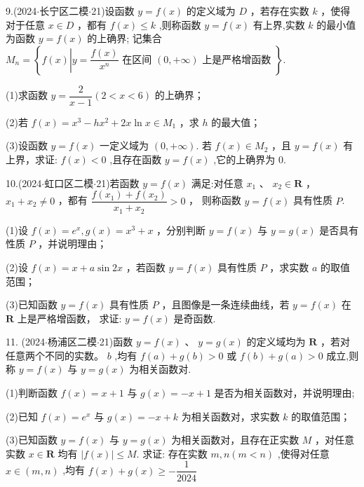 9.(2024$\cdot$长宁区二模$\cdot$21)设函数 $y = f\left( x\right)$ 的定义域为 $D$ ，若存在实数 $k$ ，使得对于任意 $x \in  D$ ，都有 $f\left( x\right)  \leq  k$ ,则称函数 $y = f\left( x\right)$ 有上界,实数 $k$ 的最小值为函数 $y = f\left( x\right)$ 的上确界; 记集合 ${M}_{n} =  \left\{  {f\left( x\right) \left| {y = \dfrac{f\left( x\right) }{{x}^{n}}\text{ 在区间 }\left( {0, + \infty }\right) }\right. \text{ 上是严格增函数 }}\right\}.$

(1)求函数 $y = \dfrac{2}{x - 1}\left( {2 < x < 6}\right)$ 的上确界；

(2)若 $f\left( x\right)  = {x}^{3} - h{x}^{2} + {2x}\ln x \in  {M}_{1}$ ，求 $h$ 的最大值；

(3)设函数 $y = f\left( x\right)$ 一定义域为 $\left( {0, + \infty }\right)$. 若 $f\left( x\right)  \in  {M}_{2}$ ，且 $y = f\left( x\right)$ 有上界，求证: $f\left( x\right)  < 0$ ,且存在函数 $y = f\left( x\right)$ ,它的上确界为 0.

10.(2024$\cdot$虹口区二模$\cdot$21)若函数 $y = f\left( x\right)$ 满足:对任意 ${x}_{1}$ 、 ${x}_{2} \in  \mathbf{R}$ ， ${x}_{1} + {x}_{2} \neq  0$ ，都有 $\dfrac{f\left( {x}_{1}\right)  + f\left( {x}_{2}\right) }{{x}_{1} + {x}_{2}} > 0$ ， 则称函数 $y = f\left( x\right)$ 具有性质 $P$.

(1)设 $f\left( x\right)  = {{e}}^{x},g\left( x\right)  = {x}^{3} + x$ ，分别判断 $y = f\left( x\right)$ 与 $y = g\left( x\right)$ 是否具有性质 $P$ ，并说明理由；

(2)设 $f\left( x\right)  = x + a\sin {2x}$ ，若函数 $y = f\left( x\right)$ 具有性质 $P$ ，求实数 $a$ 的取值范围；

(3)已知函数 $y = f\left( x\right)$ 具有性质 $P$ ，且图像是一条连续曲线，若 $y = f\left( x\right)$ 在 $\mathbf{R}$ 上是严格增函数， 求证: $y = f\left( x\right)$ 是奇函数.

11. (2024$\cdot$杨浦区二模$\cdot$21)函数 $y = f\left( x\right)$ 、 $y = g\left( x\right)$ 的定义域均为 $\mathbf{R}$ ，若对任意两个不同的实数。 $b$ ,均有 $f\left( a\right)  + g\left( b\right)  > 0$ 或 $f\left( b\right)  + g\left( a\right)  > 0$ 成立,则称 $y = f\left( x\right)$ 与 $y = g\left( x\right)$ 为相关函数对.

(1)判断函数 $f\left( x\right)  = x + 1$ 与 $g\left( x\right)  =  - x + 1$ 是否为相关函数对，并说明理由;

(2)已知 $f\left( x\right)  = {{e}}^{x}$ 与 $g\left( x\right)  =  - x + k$ 为相关函数对，求实数 $k$ 的取值范围；

(3)已知函数 $y = f\left( x\right)$ 与 $y = g\left( x\right)$ 为相关函数对，且存在正实数 $M$ ，对任意实数 $x \in  \mathbf{R}$ 均有 $\left| {f\left( x\right) }\right|  \leq  M$. 求证: 存在实数 $m,n\left( {m < n}\right)$ ,使得对任意 $x \in  \left( {m,n}\right)$ ,均有 $f\left( x\right)  + g\left( x\right)  \geq  - \dfrac{1}{2024}$

